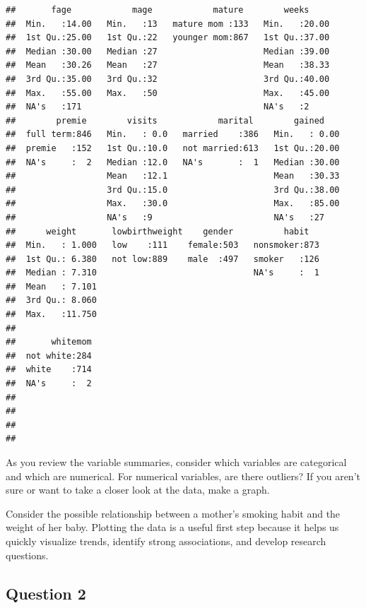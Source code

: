 \documentclass[]{article}
\begin{document}
\begin{verbatim}
##       fage            mage            mature        weeks      
##  Min.   :14.00   Min.   :13   mature mom :133   Min.   :20.00  
##  1st Qu.:25.00   1st Qu.:22   younger mom:867   1st Qu.:37.00  
##  Median :30.00   Median :27                     Median :39.00  
##  Mean   :30.26   Mean   :27                     Mean   :38.33  
##  3rd Qu.:35.00   3rd Qu.:32                     3rd Qu.:40.00  
##  Max.   :55.00   Max.   :50                     Max.   :45.00  
##  NA's   :171                                    NA's   :2      
##        premie        visits            marital        gained     
##  full term:846   Min.   : 0.0   married    :386   Min.   : 0.00  
##  premie   :152   1st Qu.:10.0   not married:613   1st Qu.:20.00  
##  NA's     :  2   Median :12.0   NA's       :  1   Median :30.00  
##                  Mean   :12.1                     Mean   :30.33  
##                  3rd Qu.:15.0                     3rd Qu.:38.00  
##                  Max.   :30.0                     Max.   :85.00  
##                  NA's   :9                        NA's   :27     
##      weight       lowbirthweight    gender          habit    
##  Min.   : 1.000   low    :111    female:503   nonsmoker:873  
##  1st Qu.: 6.380   not low:889    male  :497   smoker   :126  
##  Median : 7.310                               NA's     :  1  
##  Mean   : 7.101                                              
##  3rd Qu.: 8.060                                              
##  Max.   :11.750                                              
##                                                              
##       whitemom  
##  not white:284  
##  white    :714  
##  NA's     :  2  
##                 
##                 
##                 
## 
\end{verbatim}

As you review the variable summaries, consider which variables are
categorical and which are numerical. For numerical variables, are there
outliers? If you aren't sure or want to take a closer look at the data,
make a graph.

Consider the possible relationship between a mother's smoking habit and
the weight of her baby. Plotting the data is a useful first step because
it helps us quickly visualize trends, identify strong associations, and
develop research questions.

\subsection{Question 2}\label{question-2}
\end{document}
